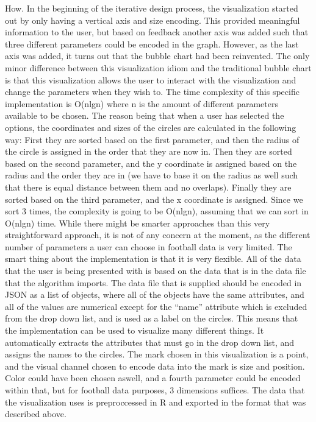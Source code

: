 \documentclass[Report.tex]{subfiles}
\begin{document}
\noindent How. In the beginning of the iterative design process, the visualization started out by only having a vertical axis and size encoding. This provided meaningful information to the user, but based on feedback another axis was added such that three different parameters could be encoded in the graph. However, as the last axis was added, it turns out that the bubble chart had been reinvented. The only minor difference between this visualization idiom and the traditional bubble chart is that this visualization allows the user to interact with the visualization and change the parameters when they wish to. The time complexity of this specific implementation is O(nlgn) where n is the amount of different parameters available to be chosen. The reason being that when a user has selected the options, the coordinates and sizes of the circles are calculated in the following way: First they are sorted based on the first parameter, and then the radius of the circle is assigned in the order that they are now in. Then they are sorted based on the second parameter, and the y coordinate is assigned based on the radius and the order they are in (we have to base it on the radius as well such that there is equal distance between them and no overlaps). Finally they are sorted based on the third parameter, and the x coordinate is assigned. Since we sort 3 times, the complexity is going to be O(nlgn), assuming that we can sort in O(nlgn) time. While there might be smarter approaches than this very straightforward approach, it is not of any concern at the moment, as the different number of parameters a user can choose in football data is very limited. The smart thing about the implementation is that it is very flexible. All of the data that the user is being presented with is based on the data that is in the data file that the algorithm imports. The data file that is supplied should be encoded in JSON as a list of objects, where all of the objects have the same attributes, and all of the values are numerical except for the ``name'' attribute which is excluded from the drop down list, and is used as a label on the circles. This means that the implementation can be used to visualize many different things. It automatically extracts the attributes that must go in the drop down list, and assigns the names to the circles. The mark chosen in this visualization is a point, and the visual channel chosen to encode data into the mark is size and position. Color could have been chosen aswell, and a fourth parameter could be encoded within that, but for football data purposes, 3 dimensions suffices. The data that the visualization uses is preproccessed in R and exported in the format that was described above.
\end{document}
